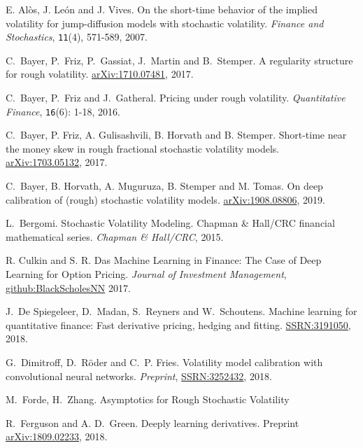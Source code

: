 \documentclass{article}
\theoremstyle{remark}
\begin{document}
\appendix
\newpage
\begin{thebibliography}{99}
E. Al\`os, J. Le\'on and J. Vives. 
On the short-time behavior of the implied volatility for jump-diffusion models with stochastic volatility. 
\textit{Finance and Stochastics}, {\tt 11}(4), 571-589, 2007.

C.~Bayer, P.~Friz, P.~Gassiat, J.~Martin and B.~Stemper.
A regularity structure for rough volatility. 
\href{https://arxiv.org/abs/1710.07481}{arXiv:1710.07481}, 2017.

C.~Bayer, P.~Friz  and J.~Gatheral.
Pricing under rough volatility. 
\textit{Quantitative Finance}, {\tt 16}(6): 1-18, 2016.

C.~Bayer, P. Friz, A. Gulisashvili, B. Horvath and B. Stemper.
Short-time near the money skew in rough fractional stochastic volatility models.
\href{https://arxiv.org/abs/1703.05132}{arXiv:1703.05132}, 2017.

C.~Bayer, B. Horvath, A. Muguruza, B. Stemper and M. Tomas.
On deep calibration of (rough) stochastic volatility models.
\href{https://arxiv.org/abs/1908.08806}{arXiv:1908.08806}, 2019.

L.~Bergomi. Stochastic Volatility Modeling.
Chapman \& Hall/CRC financial mathematical series.  \textit{Chapman \& Hall/CRC}, 2015.

R. Culkin and S. R. Das 
Machine Learning in Finance: The Case of Deep Learning for Option Pricing. 
\textit{Journal of Investment Management}, \href{https:srdas.github.io/Papers/BlackScholesNN.pdf}{github:BlackScholesNN} 2017.

 J.~De Spiegeleer, D.~Madan, S.~Reyners and W.~Schoutens. Machine learning for quantitative finance:
Fast derivative pricing, hedging and fitting. \href{https://papers.ssrn.com/sol3/papers.cfm?abstract_id=3191050}{SSRN:3191050}, 2018.

 G.~Dimitroff, D.~R\"oder and C.~P. Fries. Volatility model calibration with convolutional neural networks. \textit{Preprint}, \href{https://papers.ssrn.com/sol3/papers.cfm?abstract_id=3252432}{SSRN:3252432}, 2018.

 M.~Forde, H.~Zhang. Asymptotics for Rough Stochastic Volatility

 R.~Ferguson and A. D.~Green. Deeply learning derivatives.
  Preprint \href{https://arxiv.org/abs/1809.02233}{arXiv:1809.02233}, 2018.


\end{thebibliography}
\end{document}
